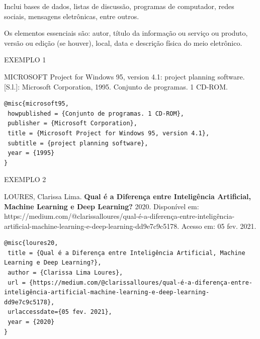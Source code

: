 Inclui bases de dados, listas de discussão, programas de computador, redes sociais, mensagens eletrônicas, entre outros.

Os elementos essenciais são: autor, título da informação ou serviço ou produto, versão ou edição (se houver), local, data e descrição física do meio eletrônico.

EXEMPLO 1 

MICROSOFT Project for Windows 95, version 4.1: project planning software. [S.l.]: Microsoft Corporation, 1995. Conjunto de programas. 1 CD-ROM.

\begin{verbatim}
@misc{microsoft95,
 howpublished = {Conjunto de programas. 1 CD-ROM},
 publisher = {Microsoft Corporation},
 title = {Microsoft Project for Windows 95, version 4.1},
 subtitle = {project planning software},
 year = {1995}
}
\end{verbatim}

EXEMPLO 2 

LOURES, Clarissa Lima. \textbf{Qual é a Diferença entre Inteligência Artificial, Machine Learning e Deep Learning?} 2020. Disponível em: https://medium.com/@clarissalloures/qual-é-a-diferença-entre-inteligência-artificial-machine-learning-e-deep-learning-dd9e7c9c5178. Acesso em: 05 fev. 2021.

\begin{verbatim}
@misc{loures20,
 title = {Qual é a Diferença entre Inteligência Artificial, Machine Learning e Deep Learning?},
 author = {Clarissa Lima Loures},
 url = {https://medium.com/@clarissalloures/qual-é-a-diferença-entre-inteligência-artificial-machine-learning-e-deep-learning-dd9e7c9c5178},
 urlaccessdate={05 fev. 2021},
 year = {2020}
}
\end{verbatim}
